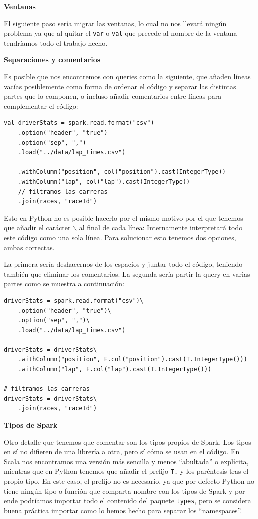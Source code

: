 \documentclass[12pt,twoside,titlepage]{report}
\newcommand{\quotes}[1]{``#1''}
\begin{document}
\textbf{Ventanas}

El siguiente paso sería migrar las ventanas, lo cual no nos llevará ningún problema ya que al quitar el \texttt{var} o \texttt{val} que precede al nombre de la ventana tendríamos todo el trabajo hecho.

\textbf{Separaciones y comentarios}

Es posible que nos encontremos con queries como la siguiente, que añaden líneas vacías posiblemente como forma de ordenar el código y separar las distintas partes que lo componen, o incluso añadir comentarios entre líneas para complementar el código:

\begin{lstlisting}
val driverStats = spark.read.format("csv")
	.option("header", "true")
	.option("sep", ",")
	.load("../data/lap_times.csv")

	.withColumn("position", col("position").cast(IntegerType)) 
	.withColumn("lap", col("lap").cast(IntegerType)) 
	// filtramos las carreras
	.join(races, "raceId")
\end{lstlisting}

Esto en Python no es posible hacerlo por el mismo motivo por el que tenemos que añadir el carácter \texttt{$\backslash$} al final de cada línea: Internamente interpretará todo este código como una sola línea. Para solucionar esto tenemos dos opciones, ambas correctas.

La primera sería deshacernos de los espacios y juntar todo el código, teniendo también que eliminar los comentarios. La segunda sería partir la query en varias partes como se muestra a continuación:

\begin{lstlisting}
driverStats = spark.read.format("csv")\
	.option("header", "true")\
	.option("sep", ",")\
	.load("../data/lap_times.csv")
	
driverStats = driverStats\
	.withColumn("position", F.col("position").cast(T.IntegerType())) 
	.withColumn("lap", F.col("lap").cast(T.IntegerType())) 
	
# filtramos las carreras
driverStats = driverStats\
	.join(races, "raceId")
\end{lstlisting}


\textbf{Tipos de Spark}

Otro detalle que tenemos que comentar son los tipos propios de Spark. Los tipos en sí no difieren de una librería a otra, pero sí cómo se usan en el código. En Scala nos encontramos una versión más sencilla y menos \quotes{abultada} o explícita, mientras que en Python tenemos que añadir el prefijo \texttt{T.} y los paréntesis tras el propio tipo. En este caso, el prefijo no es necesario, ya que por defecto Python no tiene ningún tipo o función que comparta nombre con los tipos de Spark y por ende podríamos importar todo el contenido del paquete \texttt{types}, pero se considera buena práctica importar como lo hemos hecho para separar los \quotes{namespaces}. 
\end{document}
